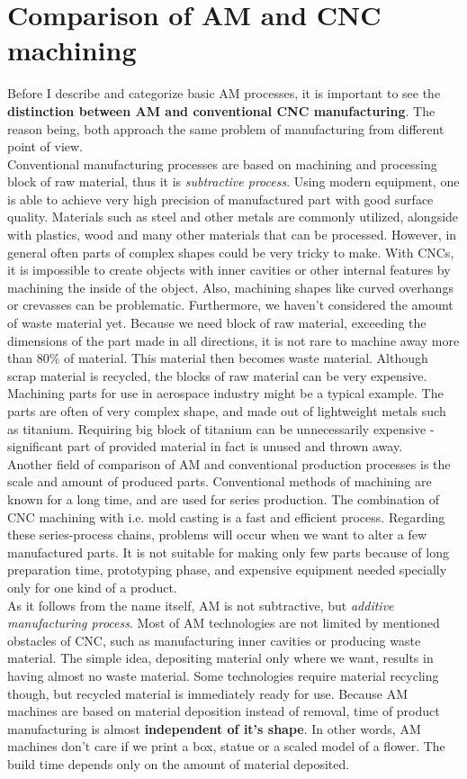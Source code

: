 \documentclass[a4paper, twoside, 11pt]{report}
\begin{document}
\section{Comparison of AM and CNC machining}
%
Before I describe and categorize basic AM processes, it is important to see the \textbf{distinction between AM and conventional CNC manufacturing}. The reason being, both approach the same problem of manufacturing from different point of view.\\
Conventional manufacturing processes are based on machining and processing block of raw material, thus it is \textit{subtractive process}. Using modern equipment, one is able to achieve very high precision of manufactured part with good surface quality. Materials such as steel and other metals are commonly utilized, alongside with plastics, wood and many other materials that can be processed. However, in general often parts of complex shapes could be very tricky to make. With CNCs, it is impossible to create objects with inner cavities or other internal features by machining the inside of the object. Also, machining shapes like curved overhangs or crevasses can be problematic. Furthermore, we haven’t considered the amount of waste material yet. Because we need block of raw material, exceeding the dimensions of the part made in all directions, it is not rare to machine away more than 80\% of material. This material then becomes waste material. Although scrap material is recycled, the blocks of raw material can be very expensive. Machining parts for use in aerospace industry might be a typical example. The parts are often of very complex shape, and made out of lightweight metals such as titanium. Requiring big block of titanium can be unnecessarily expensive - significant part of provided material in fact is unused and thrown away.\\
Another field of comparison of AM and conventional production processes is the scale and amount of produced parts. Conventional methods of machining are known for a long time, and are used for series production. The combination of CNC machining with i.e. mold casting is a fast and efficient process. Regarding these series-process chains, problems will occur when we want to alter a few manufactured parts. It is not suitable for making only few parts because of long preparation time, prototyping phase, and expensive equipment needed specially only for one kind of a product.\\
As it follows from the name itself, AM is not subtractive, but \textit{additive manufacturing process}. Most of AM technologies are not limited by mentioned obstacles of CNC, such as manufacturing inner cavities or producing waste material. The simple idea, depositing material only where we want, results in having almost no waste material. Some technologies require material recycling though, but recycled material is immediately ready for use. Because AM machines are based on material deposition instead of removal, time of product manufacturing is almost \textbf{independent of it's shape}. In other words, AM machines don't care if we print a box, statue or a scaled model of a flower. The build time depends only on the amount of material deposited.\\
\end{document}
